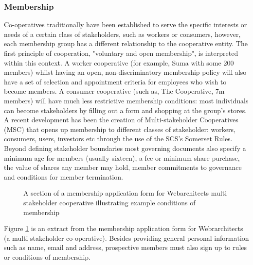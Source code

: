 \subsubsection{Membership}
Co-operatives traditionally have been established to serve the specific interests or needs of a certain class of stakeholders, such as workers or consumers, however, each membership group has a different relationship to the cooperative entity. The first principle of cooperation, "voluntary and open membership", is interpreted within this context. A worker cooperative (for example, Suma\cite{Suma} with some 200 members) whilst having an open, non-discriminatory membership policy will also have a set of selection and appointment criteria for employees who wish to become members.  A consumer cooperative (such as, The Cooperative\cite{TheCoop}, 7m members) will have much less restrictive membership conditions: most individuals can become stakeholders by filling out a form and shopping at the group's stores.  A recent development has been the creation of Multi-stakeholder Cooperatives (MSC) that opens up membership to different classes of stakeholder: workers, consumers, users, investors etc through the use of the SCS's Somerset Rules.\\

Beyond defining stakeholder boundaries most governing documents also specify a minimum age for members (usually sixteen), a fee or minimum share purchase, the value of shares any member may hold, member commitments to governance and conditions for member termination.\\

\begin{figure}
\centering
{}
\decoRule
\caption[Webarchitect's Membership Form]{A section of a membership application form for Webarchitects multi stakeholder cooperative illustrating example conditions of membership}
\label{fig:webarchForm}
\end{figure} 
Figure \ref{fig:webarchForm} is an extract from the membership application form for Webrarchitects\cite{webarchitects} (a multi stakeholder co-operative). Besides providing general personal information such as name, email and address, prospective members must also sign up to rules or conditions of membership.\\


